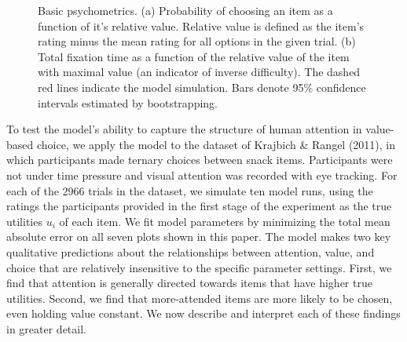 \documentclass[12pt,a4paperpaper,]{article}
\begin{document}
\begin{figure}[t!]
  \centering
  \caption{Basic psychometrics.
    (a) Probability of choosing an item as a function of it's relative value. Relative value is defined as the item's rating minus the mean rating for all options in the given trial.
    (b) Total fixation time as a function of the relative value of the item with maximal value (an indicator of inverse difficulty).
    The dashed red lines indicate the model simulation. Bars denote 95\% confidence intervals estimated by bootstrapping.
  }
  \label{fig:fixate_on_best}
\end{figure}

To test the model's ability to capture the structure of human attention in value-based choice, we apply the model to the dataset of Krajbich \& Rangel (2011), in which participants made ternary choices between snack items. Participants were not under time pressure and visual attention was recorded with eye tracking. For each of the 2966 trials in the dataset, we simulate ten model runs, using the ratings the participants provided in the first stage of the experiment as the true utilities $u_i$ of each item. We fit model parameters by minimizing the total mean absolute error on all seven plots shown in this paper. The model makes two key qualitative predictions about the relationships between attention, value, and choice that are relatively insensitive to the specific parameter settings. First, we find that attention is generally directed towards items that have higher true utilities. Second, we find that more-attended items are more likely to be chosen, even holding value constant. We now describe and interpret each of these findings in greater detail.
\end{document}
